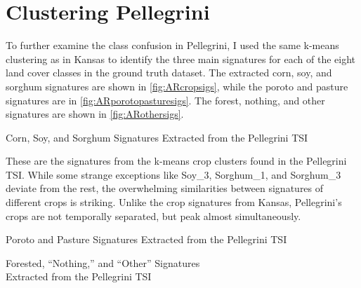 \section{Clustering Pellegrini}

To further examine the class confusion in Pellegrini, I used the same k-means clustering as in Kansas to identify the three main signatures for each of the eight land cover classes in the ground truth dataset. The extracted corn, soy, and sorghum signatures are shown in \autoref{fig:ARcropsigs}, while the poroto and pasture signatures are in \autoref{fig:ARporotopasturesigs}. The forest, nothing, and other signatures are shown in \autoref{fig:ARothersigs}.

\begin{ssfigure}
  \centering
  
  \caption{Corn, Soy, and Sorghum Signatures Extracted from the Pellegrini TSI}
  \medskip
  \small
  These are the signatures from the k-means crop clusters found in the Pellegrini TSI. While some strange exceptions like Soy\_3, Sorghum\_1, and Sorghum\_3 deviate from the rest, the overwhelming similarities between signatures of different crops is striking. Unlike the crop signatures from Kansas, Pellegrini's crops are not temporally separated, but peak almost simultaneously.
  \label{fig:ARcropsigs}
\end{ssfigure}

\begin{ssfigure}
  \centering
  
  \caption{Poroto and Pasture Signatures Extracted from the Pellegrini TSI}
  \label{fig:ARporotopasturesigs}
\end{ssfigure}

\begin{ssfigure}
  \centering
  
  \caption[Forested, ``Nothing,'' and ``Other'' Signatures Extracted from the Pellegrini TSI]{Forested, ``Nothing,'' and ``Other'' Signatures\\Extracted from the Pellegrini TSI}
  \label{fig:ARothersigs}
\end{ssfigure}

